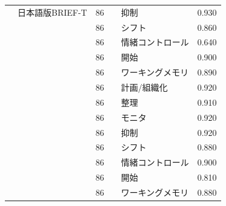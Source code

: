 \begin{landscape}
\begin{longtable}{p{2cm}p{2cm}p{2cm}p{6cm}p{2cm}p{2cm}}
        \citet{Nagatani202292}   & 日本語版BRIEF-T                      & 86  &                                                     & 抑制                   & 0.930   \\
                                 &                                  & 86  &                                                     & シフト                  & 0.860   \\
                                 &                                  & 86  &                                                     & 情緒コントロール             & 0.640   \\
                                 &                                  & 86  &                                                     & 開始                   & 0.900   \\
                                 &                                  & 86  &                                                     & ワーキングメモリ             & 0.890   \\
                                 &                                  & 86  &                                                     & 計画/組織化               & 0.920   \\
                                 &                                  & 86  &                                                     & 整理                   & 0.910   \\
                                 &                                  & 86  &                                                     & モニタ                  & 0.920   \\
                                 &                                  & 86  &                                                     & 抑制                   & 0.920   \\
                                 &                                  & 86  &                                                     & シフト                  & 0.880   \\
                                 &                                  & 86  &                                                     & 情緒コントロール             & 0.900   \\
                                 &                                  & 86  &                                                     & 開始                   & 0.810   \\
                                 &                                  & 86  &                                                     & ワーキングメモリ             & 0.880   \\

\end{longtable}
\end{landscape}
